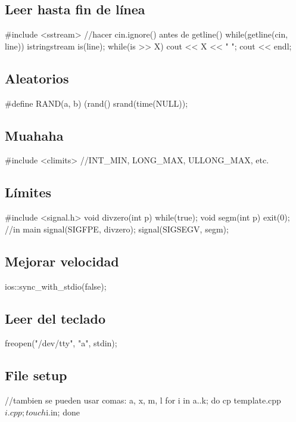 \documentclass[10pt,landscape,twocolumn,a4paper,notitlepage]{article}
\begin{document}
\subsection*{Leer hasta fin de línea}
\begin{code}
#include <sstream>
//hacer cin.ignore() antes de getline()
while(getline(cin, line)){
   	 istringstream is(line);
   	 while(is >> X)
   		 cout << X << " ";
   	 cout << endl;
}
\end{code}
\subsection*{Aleatorios}
\begin{code}
#define RAND(a, b) (rand()%
srand(time(NULL));
\end{code}
\subsection*{Muahaha}
\begin{code}
#include <climits> //INT_MIN, LONG_MAX, ULLONG_MAX, etc.
\end{code}
\subsection*{Límites}
\begin{code}
#include <signal.h>
void divzero(int p){
	while(true);}
void segm(int p){
	exit(0);}
//in main
signal(SIGFPE, divzero);
signal(SIGSEGV, segm);
\end{code}
\subsection*{Mejorar velocidad}
\begin{code}
ios::sync_with_stdio(false);
\end{code}
\subsection*{Leer del teclado}
\begin{code}
freopen("/dev/tty", "a", stdin);
\end{code}
\subsection*{File setup}
\begin{code}
//tambien se pueden usar comas: {a, x, m, l}
for i in {a..k}; do cp template.cpp $i.cpp; touch $i.in; done
\end{code}
\end{document}
